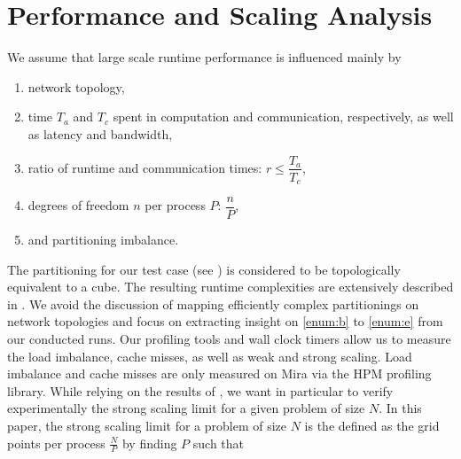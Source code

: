 \documentclass{sig-alternate}
\begin{document}



\section{Performance and Scaling Analysis}
\label{sec:analysis}
We assume that large scale runtime performance is influenced mainly by 
\begin{enumerate}
  \item network topology, \label{enum:a}
  \item time $T_a$ and $T_c$ spent in computation and communication,
    respectively, as well as latency and bandwidth\label{enum:b},
  \item ratio of runtime and communication times: $r \leq \dfrac{T_a}{T_c}$,\label{enum:c}
  \item degrees of freedom $n$ per process $P$: $\dfrac{n}{P}$,\label{enum:d}
  \item and partitioning imbalance.\label{enum:e}
\end{enumerate}

The partitioning for our test case (see ) is considered to be
topologically equivalent to a cube. The resulting runtime complexities are
extensively described in \cite{fischer:scaling}. We avoid the discussion of
mapping efficiently complex partitionings on network topologies and focus on
extracting insight on \ref{enum:b} to \ref{enum:e} from our conducted runs. Our
profiling tools and wall clock timers allow us to measure the load imbalance,
cache misses, as well as weak and strong scaling. Load imbalance and cache
misses are only measured on Mira via the HPM profiling library. 
While relying on the results of \cite{fischer:scaling}, we want in particular to verify
experimentally the strong scaling limit for a given problem of size $N$. 
In this paper, the strong scaling limit for a problem of size $N$ is the defined
as the grid points per process $\frac{N}{P}$ by finding $P$ such that
\end{document}
